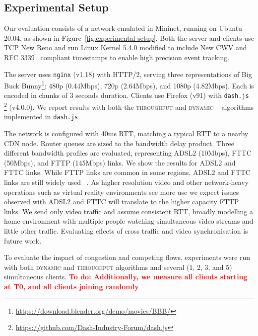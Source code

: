 \documentclass[10pt, acmlarge]{acmart}
\newcommand{\todo}[1]{\textbf{\textcolor{red}{To do: #1}}}
\begin{document}
\subsection{Experimental Setup}
\label{sec:experimental-setup}

Our evaluation consists of a network emulated in Mininet, running on Ubuntu 20.04, 
as shown in Figure~\ref{fig:experimental-setup}. Both the server and clients use TCP New Reno 
and run Linux Kernel 5.4.0 modified to include New CWV and RFC 
3339~\cite{rfc3339-precise-timestamps} compliant timestamps to enable high precision event 
tracking. 

The server uses \texttt{nginx} (v1.18) with HTTP/2, serving three representations of 
Big Buck Bunny\footnote{\url{https://download.blender.org/demo/movies/BBB/}}: 
480p (0.44Mbps), 720p (2.64Mbps), and 1080p (4.82Mbps). Each is encoded in chunks of 3 seconds
 duration.
Clients use Firefox (v91) with \texttt{dash.js}
\footnote{\url{https://github.com/Dash-Industry-Forum/dash.js}} (v4.0.0). We
report results with both the \textsc{throughput} and \textsc{dynamic}
~\cite{Spiteri-2019-from-theory-to-practice-sabre} algorithms implemented in \texttt{dash.js}.

The network is configured with 40ms RTT, matching a typical RTT to a nearby CDN node.
Router queues are sized to the bandwidth delay product. Three different bandwidth profiles 
are evaluated, representing ADSL2 (10Mbps), FTTC (50Mbps), and FTTP (145Mbps) links. 
We show the results for ADSL2 and FTTC links.
While FTTP links are common in some regions, ADSL2 and FTTC links are still widely used
~\cite{ofcom-2020-report,FCC-measuring-broadband-america,EC-measuring-broadband-europe,
ACCC-measuring-broadband-australia}. As higher resolution video and other network-heavy 
operations such as virtual reality environments see more use we expect issues observed with 
ADSL2 and FTTC will translate to the higher capacity FTTP links.
We send only video traffic and assume consistent RTT, broadly modelling a home environment 
with multiple people watching simultaneous video streams and little other traffic. 
Evaluating effects of cross traffic and video synchronisation is future work.

To evaluate the impact of congestion and competing flows, experiments were run with both 
\textsc{dynamic} and \textsc{throughput} algorithms and several (1, 2, 3, and 5) 
simultaneous clients.
\todo{Additionally, we measure all clients starting at T0, and all clients joining randomly}
\end{document}
